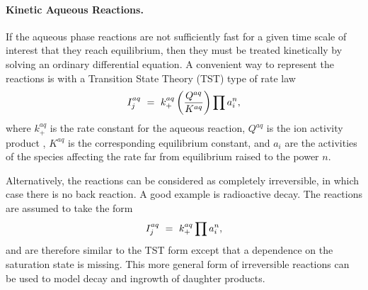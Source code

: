 \paragraph{Kinetic Aqueous Reactions.}
If the aqueous phase reactions are not sufficiently fast for a given time scale of interest that they reach equilibrium, then they must be treated kinetically by solving an ordinary differential equation.  A convenient way to represent the reactions is with a Transition State Theory (TST) type of rate law~\citep{lasaga_1981, lasaga_1984, aagaard_1982}
\begin{equation} \label{eq:AqueousTSTkinetics}
  I_j^{aq} \ =\  k_{+}^{aq} \left(  \frac{Q^{aq}}{K^{aq}} \right) \prod a_{i}^{n},
\end{equation}
where $k_{+}^{aq}$ is the rate constant for the aqueous reaction, $Q^{aq}$ is the ion activity product , $K^{aq}$ is the corresponding equilibrium constant, and $a_i$ are the activities of the species affecting the rate far from equilibrium raised to the power $n$.

Alternatively, the reactions can be considered as completely irreversible, in which case there is no back reaction.  A good example is radioactive decay. The reactions are assumed to take the form
\begin{equation} \label{eq:IrreversibleKinetics}
  I_j^{aq} \ =\  k_{+}^{aq} \prod a_{i}^{n} ,
\end{equation}
and are therefore similar to the TST form except that a dependence on the saturation state is missing.   This more general form of irreversible reactions can be used to model decay and ingrowth of daughter products.


